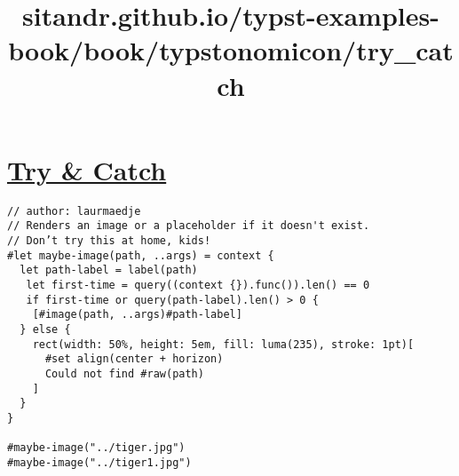\title{sitandr.github.io/typst-examples-book/book/typstonomicon/try_catch}

\section{\texorpdfstring{\hyperref[try--catch]{Try \&
Catch}}{Try \& Catch}}\label{try--catch}

\begin{verbatim}
// author: laurmaedje
// Renders an image or a placeholder if it doesn't exist.
// Don’t try this at home, kids!
#let maybe-image(path, ..args) = context {
  let path-label = label(path)
   let first-time = query((context {}).func()).len() == 0
   if first-time or query(path-label).len() > 0 {
    [#image(path, ..args)#path-label]
  } else {
    rect(width: 50%, height: 5em, fill: luma(235), stroke: 1pt)[
      #set align(center + horizon)
      Could not find #raw(path)
    ]
  }
}

#maybe-image("../tiger.jpg")
#maybe-image("../tiger1.jpg")
\end{verbatim}

\pandocbounded{}
